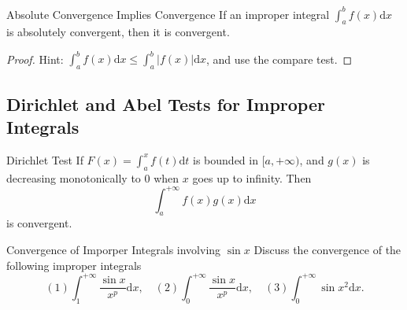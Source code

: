 \begin{proposition}{Absolute Convergence Implies Convergence}{}
  If an improper integral $\int_a^b f(x)\mathrm{d} x$ is absolutely convergent,
  then it is convergent.
\end{proposition}

\begin{proof}
  Hint: $\int_a^b f(x)\mathrm{d} x \leq \int_a^b |f(x)|\mathrm{d} x$,
  and use the compare test.
\end{proof}


\subsection{Dirichlet and Abel Tests for Improper Integrals}

\begin{theorem}{Dirichlet Test}{}
  If $F(x) = \int_a^x f(t)\mathrm{d} t$ is bounded in $[a, +\infty)$,
  and $g(x)$ is decreasing monotonically to $0$ when $x$ goes up to infinity.
  Then
  \begin{equation}
    \int_a^{+\infty} f(x)g(x)\mathrm{d}x
  \end{equation}
  is convergent.
\end{theorem}

\begin{example}{Convergence of Imporper Integrals involving $\sin x$}{}
  Discuss the convergence of the following improper integrals
  \begin{equation}
    (1) \int_1^{+\infty} \frac{\sin x}{x^p}\mathrm{d}x, \quad
    (2) \int_0^{+\infty} \frac{\sin x}{x^p} \mathrm{d} x, \quad
    (3) \int_0^{+\infty} \sin x^2 \mathrm{d} x.
  \end{equation}
\end{example}

